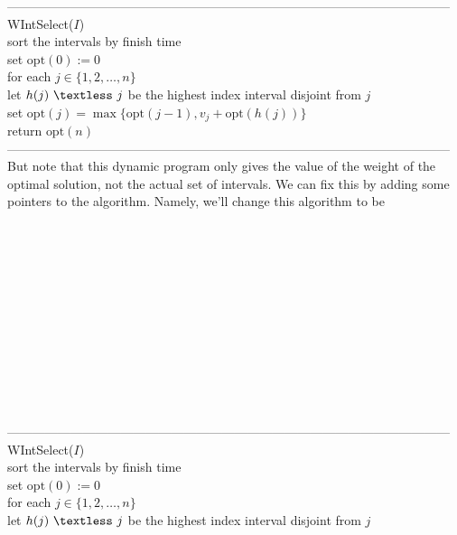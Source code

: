 \documentclass{article}
\newcommand{\lt}{\textless}
\newcommand{\opt}{\text{opt}}
\begin{document}
---------------------------------------------------------------------------------------------------------
WIntSelect($I$)\\
	\hspace*{7mm} sort the intervals by finish time\\
	\hspace*{7mm} set $\opt(0) := 0$\\
	\hspace*{7mm} for each $j \in \{1, 2, \dots, n\}$\\
	\hspace*{14mm} let $h(j)\ \lt\ j$ be the highest index interval disjoint from $j$\\
	\hspace*{14mm} set $\opt(j) = \max\{\opt(j-1), v_j + \opt(h(j))\}$\\
	\hspace*{7mm} return $\opt(n)$\\
---------------------------------------------------------------------------------------------------------\\
But note that this dynamic program only gives the value of the weight of the optimal solution, not the actual set of intervals. We can fix this by adding some pointers to the algorithm. Namely, we'll change this algorithm to be\\\\\\\\\\\\\\\\\\\\\\\\\\
---------------------------------------------------------------------------------------------------------
WIntSelect($I$)\\
	\hspace*{7mm} sort the intervals by finish time\\
	\hspace*{7mm} set $\opt(0) := 0$\\
	\hspace*{7mm} for each $j \in \{1, 2, \dots, n\}$\\
	\hspace*{14mm} let $h(j)\ \lt\ j$ be the highest index interval disjoint from $j$\\
\end{document}
